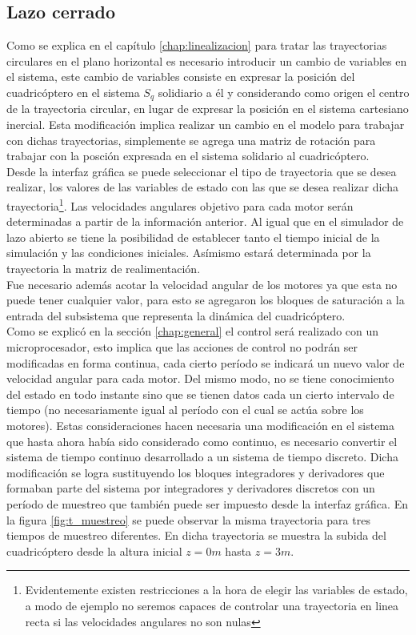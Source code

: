 \documentclass[main]{subfiles}
\begin{document}
\subsection{Lazo cerrado}

Como se explica en el cap\'itulo \ref{chap:linealizacion} para tratar las trayectorias circulares en el plano horizontal es necesario introducir un cambio de variables en el sistema, este cambio de variables consiste en expresar la posici\'on del cuadric\'optero en el sistema $S_q$ solidiario a \'el y considerando como origen el centro de la trayectoria circular, en lugar de expresar la posici\'on en el sistema cartesiano inercial. Esta modificaci\'on implica realizar un cambio en el modelo para trabajar con dichas trayectorias, simplemente se agrega una matriz de rotaci\'on para trabajar con la posci\'on expresada en el sistema solidario al cuadric\'optero.\\ 

Desde la interfaz gr\'afica se puede seleccionar el tipo de trayectoria que se desea realizar, los valores de las variables de estado con las que se desea realizar dicha trayectoria\footnote{Evidentemente existen restricciones a la hora de elegir las variables de estado, a modo de ejemplo no seremos capaces de controlar una trayectoria en linea recta si las velocidades angulares no son nulas}. Las velocidades angulares objetivo para cada motor ser\'an determinadas a partir de la informaci\'on anterior. Al igual que en el simulador de lazo abierto se tiene la posibilidad de establecer tanto el tiempo inicial de la simulaci\'on y las condiciones iniciales. As\'imismo estar\'a determinada por la trayectoria la matriz de realimentaci\'on.\\

Fue necesario adem\'as acotar la velocidad angular de los motores ya que esta no puede tener cualquier valor, para esto se agregaron los bloques de saturaci\'on a la entrada del subsistema que representa la din\'amica del cuadric\'optero.\\

Como se explic\'o en la secci\'on \ref{chap:general} el control ser\'a realizado con un microprocesador, esto implica que las acciones de control no podr\'an ser modificadas en forma continua, cada cierto per\'iodo se indicar\'a un nuevo valor de velocidad angular para cada motor. Del mismo modo, no se tiene conocimiento del estado en todo instante sino que se tienen datos cada un cierto intervalo de tiempo (no necesariamente igual al per\'iodo con el cual se act\'ua sobre los motores). Estas consideraciones hacen necesaria una modificaci\'on en el sistema que hasta ahora hab\'ia sido considerado como continuo, es necesario convertir el sistema de tiempo continuo desarrollado a un sistema de tiempo discreto. Dicha modificaci\'on se logra sustituyendo los bloques integradores y derivadores que formaban parte del sistema por integradores y derivadores discretos con un per\'iodo de muestreo que tambi\'en puede ser impuesto desde la interfaz gr\'afica. En la figura \ref{fig:t_muestreo} se puede observar la misma trayectoria para tres tiempos de muestreo diferentes. En dicha trayectoria se muestra la subida del cuadric\'optero desde la altura inicial $z=0m$ hasta $z=3m$. 
 
\end{document}
